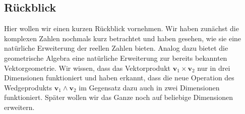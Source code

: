 \subsection{Rückblick}
Hier wollen wir einen kurzen Rückblick vornehmen. Wir haben zunächst
die komplexen Zahlen nochmals kurz betrachtet und haben gesehen,
wie sie eine natürliche Erweiterung der reellen Zahlen bieten.
Analog dazu bietet die geometrische Algebra eine natürliche
Erweiterung zur bereits bekannten Vektorgeometrie. Wir wissen,
dass das Vektorprodukt $\mathbf{v}_1 \times \mathbf{v}_2$ nur
in drei Dimensionen funktioniert und haben erkannt, dass
die neue Operation des Wedgeprodukts $\mathbf{v}_1 \wedge \mathbf{v}_2$
im Gegensatz dazu auch in zwei Dimensionen funktioniert.
Später wollen wir das Ganze noch auf beliebige Dimensionen erweitern.
